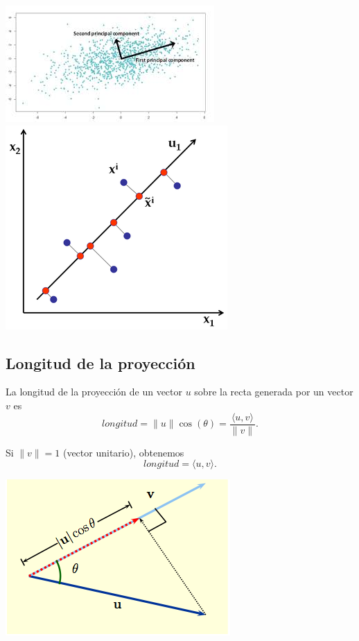 \documentclass[a4paper]{article}
\begin{document}
\begin{center}
\includegraphics[scale=0.5]{dosComponentes.jpg}
\includegraphics[scale=0.3]{projection.png}
\end{center}

\subsection{Longitud de la proyección }

\begin{minipage}{.6\textwidth}
La longitud de la proyecci\'on de un vector $u$ sobre la recta generada por un vector $v$ es
$$longitud = \|u\| \cos(\theta) = \frac{\langle u, v \rangle}{\|v\|}.$$

Si $\|v\| = 1$ (vector unitario), obtenemos $$longitud = \langle u, v \rangle.$$

\end{minipage} \hspace{.2cm} %
\begin{minipage}{.35\textwidth}
\begin{center}
\includegraphics[scale=0.25]{vectors08.png}
\end{center}

\end{minipage} \hspace{.4cm} %
\end{document}
